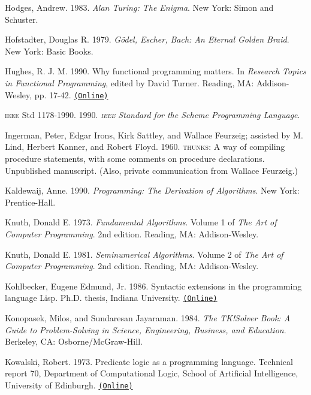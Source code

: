 \documentclass[8pt,oneside]{book}
\newcommand{\acronym}[1]{\textsc{\MakeLowercase{#1}}}
\newcommand{\code}[1]{\texttt{#1}}
\begin{document}
 \label{Hodges 1983}
Hodges, Andrew. 1983.  \textit{Alan Turing: The Enigma}. New York: Simon and
Schuster.

 \label{Hofstadter 1979}
Hofstadter, Douglas R.  1979.  \textit{G\"odel, Escher, Bach: An Eternal Golden
Braid}. New York: Basic Books.

 \label{Hughes 1990}
Hughes, R. J. M.  1990.  Why functional programming matters.  In \textit{Research
Topics in Functional Programming}, edited by David Turner.  Reading, MA:
Addison-Wesley, pp. 17-42.
\href{http://www.cs.kent.ac.uk/people/staff/dat/miranda/whyfp90.pdf}{\code{(Online)}}

 \label{IEEE 1990}
\acronym{IEEE} Std 1178-1990.  1990.  \textit{\acronym{IEEE} Standard for the
Scheme Programming Language}.

 \label{Ingerman et al. 1960}
Ingerman, Peter, Edgar Irons, Kirk Sattley, and Wallace Feurzeig; assisted by
M. Lind, Herbert Kanner, and Robert Floyd.  1960.  \acronym{THUNKS}: A way of
compiling procedure statements, with some comments on procedure declarations.
Unpublished manuscript.  (Also, private communication from Wallace Feurzeig.)

 \label{Kaldewaij 1990}
Kaldewaij, Anne. 1990.  \textit{Programming: The Derivation of Algorithms}. New
York: Prentice-Hall.

 \label{Knuth (1973)}
Knuth, Donald E.  1973.  \textit{Fundamental Algorithms}. Volume 1 of \textit{The
Art of Computer Programming}.  2nd edition. Reading, MA: Addison-Wesley.

 \label{Knuth 1981}
Knuth, Donald E.  1981.  \textit{Seminumerical Algorithms}. Volume 2 of \textit{The
Art of Computer Programming}.  2nd edition. Reading, MA: Addison-Wesley.

 \label{Kohlbecker 1986}
Kohlbecker, Eugene Edmund, Jr. 1986.  Syntactic extensions in the programming
language Lisp.  Ph.D. thesis, Indiana University.
\href{http://www.ccs.neu.edu/scheme/pubs/dissertation-kohlbecker.pdf}{\code{(Online)}}

 \label{Konopasek and Jayaraman 1984}
Konopasek, Milos, and Sundaresan Jayaraman.  1984.  \textit{The TK!Solver Book: A
Guide to Problem-Solving in Science, Engineering, Business, and
Education}. Berkeley, CA: Osborne/McGraw-Hill.

 \label{Kowalski (1973; 1979)}
Kowalski, Robert.  1973.  Predicate logic as a programming language.  Technical
report 70, Department of Computational Logic, School of Artificial
Intelligence, University of Edinburgh.
\href{http://www.doc.ic.ac.uk/~rak/papers/IFIP\%2074.pdf}{\code{(Online)}}
\end{document}
